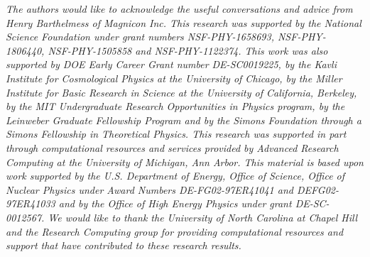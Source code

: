 \documentclass[aps,prd,amsmath,amssymb,reprint,superscriptaddress, nofootinbib,
]{revtex4-1}
\begin{document}
 
\begin{acknowledgments}
\it
The authors would like to acknowledge the useful conversations and advice from Henry Barthelmess of Magnicon Inc. This research was supported by the National Science Foundation under grant numbers NSF-PHY-1658693, NSF-PHY-1806440, NSF-PHY-1505858 and NSF-PHY-1122374. This work was also supported by DOE Early Career Grant number DE-SC0019225, by the Kavli Institute for Cosmological Physics at the University of Chicago, by the Miller Institute for Basic Research in Science at the University of California, Berkeley, by the MIT Undergraduate Research Opportunities in Physics program, by the Leinweber Graduate Fellowship Program and by the Simons Foundation through a Simons Fellowship in Theoretical Physics. This research was supported in part through computational resources and services provided by Advanced Research Computing at the University of Michigan, Ann Arbor. This material is based upon work supported by the U.S. Department of Energy, Office of Science, Office of Nuclear Physics under Award Numbers DE-FG02-97ER41041 and DEFG02-97ER41033 and by the Office of High Energy Physics under grant DE-SC-0012567. We would like to thank the University of North Carolina at Chapel Hill and the Research Computing group for providing computational resources and support that have contributed to these research results.
\end{acknowledgments}
\end{document}
